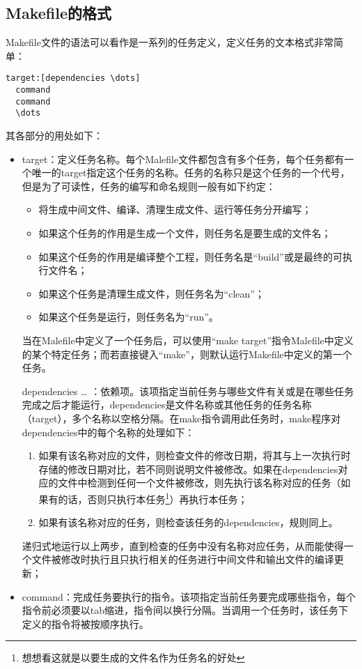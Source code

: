 \subsection{Makefile的格式}
Makefile文件的语法可以看作是一系列的任务定义，定义任务的文本格式非常简单：
\begin{lstlisting}
target:[dependencies \dots]
  command
  command
  \dots
\end{lstlisting}
其各部分的用处如下：
\begin{itemize}
	\item target：定义任务名称。每个Malefile文件都包含有多个任务，每个任务都有一个唯一的target指定这个任务的名称。任务的名称只是这个任务的一个代号，但是为了可读性，任务的编写和命名规则一般有如下约定：
	      \begin{itemize}
		      \item 将生成中间文件、编译、清理生成文件、运行等任务分开编写；
		      \item 如果这个任务的作用是生成一个文件，则任务名是要生成的文件名；
		      \item 如果这个任务的作用是编译整个工程，则任务名是“build”或是最终的可执行文件名；
		      \item 如果这个任务是清理生成文件，则任务名为“clean”；
		      \item 如果这个任务是运行，则任务名为“run”。
	      \end{itemize}
	      当在Malefile中定义了一个任务后，可以使用“make target”指令Malefile中定义的某个特定任务；而若直接键入“make”，则默认运行Makefile中定义的第一个任务。
	\item [dependencies \dots]：依赖项。该项指定当前任务与哪些文件有关或是在哪些任务完成之后才能运行，dependencies是文件名称或其他任务的任务名称（target），多个名称以空格分隔。在make指令调用此任务时，make程序对dependencies中的每个名称的处理如下：
	      \begin{enumerate}
		      \item 如果有该名称对应的文件，则检查文件的修改日期，将其与上一次执行时存储的修改日期对比，若不同则说明文件被修改。如果在dependencies对应的文件中检测到任何一个文件被修改，则先执行该名称对应的任务（如果有的话，否则只执行本任务\footnote{想想看这就是以要生成的文件名作为任务名的好处}）再执行本任务；
		      \item 如果有该名称对应的任务，则检查该任务的dependencies，规则同上。
	      \end{enumerate}
	      递归式地运行以上两步，直到检查的任务中没有名称对应任务，从而能使得一个文件被修改时执行且只执行相关的任务进行中间文件和输出文件的编译更新；
	\item command：完成任务要执行的指令。该项指定当前任务要完成哪些指令，每个指令前必须要以tab缩进，指令间以换行分隔。当调用一个任务时，该任务下定义的指令将被按顺序执行。
\end{itemize}

